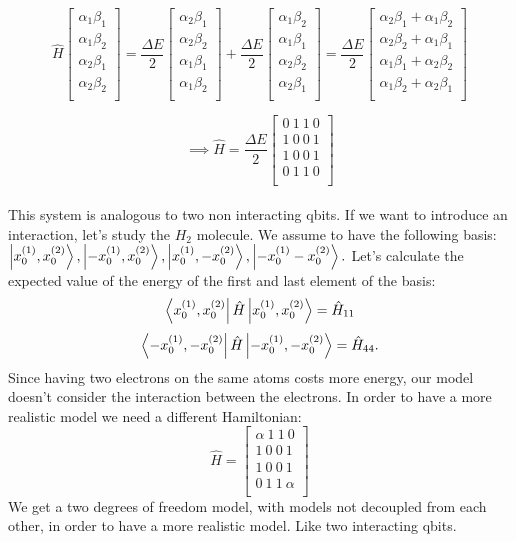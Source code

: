 \documentclass{article}
\begin{document}
$$ \hat{H} \begin{bmatrix}
    \alpha_1 \beta_1 \\
    \alpha_1 \beta_2 \\
    \alpha_2 \beta_1 \\ 
    \alpha_2 \beta_2 \\
\end{bmatrix} = \frac{\Delta E}{2} \begin{bmatrix}
    \alpha_2 \beta_1 \\
    \alpha_2 \beta_2 \\
    \alpha_1 \beta_1 \\ 
    \alpha_1 \beta_2 \\
\end{bmatrix} + \frac{\Delta E}{2} \begin{bmatrix}
    \alpha_1 \beta_2 \\
    \alpha_1 \beta_1 \\
    \alpha_2 \beta_2 \\ 
    \alpha_2 \beta_1 \\
\end{bmatrix}  = \frac{\Delta E}{2} \begin{bmatrix}
    \alpha_2 \beta_1 + \alpha_1 \beta_2 \\
    \alpha_2 \beta_2 + \alpha_1 \beta_1 \\
    \alpha_1 \beta_1 + \alpha_2 \beta_2 \\ 
    \alpha_1 \beta_2 + \alpha_2 \beta_1 \\
\end{bmatrix}$$

$$\implies \hat{H} = \frac{\Delta E}{2} \begin{bmatrix}
    0 \ 1 \ 1 \ 0 \\
    1 \ 0 \ 0 \ 1 \\
    1 \ 0 \ 0 \ 1 \\
    0 \ 1 \ 1 \ 0 \\ 
\end{bmatrix}$$
\\
This system is analogous to two non interacting qbits.
If we want to introduce an interaction, let's study the $H_{2}$ molecule. We assume to have the following basis:
$\ket{x_0^{(1)},x_0^{(2)}},\ket{-x_0^{(1)},x_0^{(2)}},\ket{x_0^{(1)}, -x_0^{(2)}}, \ket{-x_0^{(1)} -x_0^{(2)}}.$
Let's calculate the expected value of the energy of the first and last element of the basis:
$$\bra{x_0^{(1)},x_0^{(2)}} \hat{H} \ket{x_0^{(1)},x_0^{(2)}} = \hat{H}_{11}$$
$$\bra{-x_0^{(1)},-x_0^{(2)}} \hat{H} \ket{-x_0^{(1)},-x_0^{(2)}} = \hat{H}_{44}.$$
Since having  two electrons on the same atoms costs more energy, our model doesn't consider the interaction between the electrons.
In order to have a more realistic model we need a different Hamiltonian:
$$ \hat{H} =  \begin{bmatrix}
    \alpha \ 1 \ 1 \ 0 \\
    1 \ 0 \ 0 \ 1 \\
    1 \ 0 \ 0 \ 1 \\
    0 \ 1 \ 1 \ \alpha \\ 
\end{bmatrix} $$
We get a two degrees of freedom model, with models not decoupled from each other, in order to have a more realistic model. Like two interacting qbits.
\end{document}
